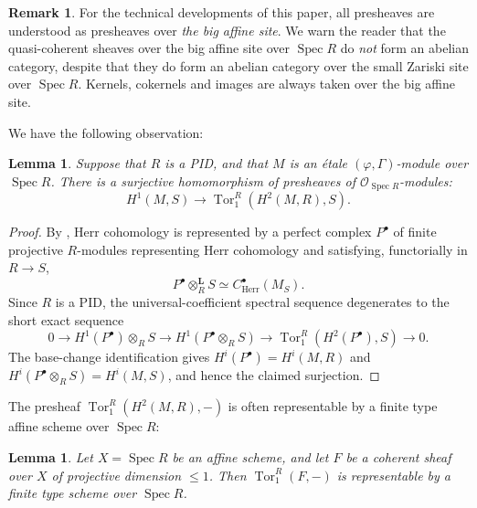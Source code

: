 \documentclass[11pt]{amsart}
\newcommand{\MAJOREDIT}[1]{{\color{revisiongreen}#1}}
\newtheorem{lem}[thm]{Lemma}
\theoremstyle{definition}
\newtheorem{remark}[thm]{Remark}
\newcommand{\cO}{\mathcal{O}}
\DeclareMathOperator{\Spec}{Spec}
\DeclareMathOperator{\Tor}{Tor}
\newcommand{\Herr}{\mathrm{Herr}}
\begin{document}
\begin{remark}
For the technical developments of this paper,
all presheaves are understood as presheaves
over {\it the big affine site}.
We warn the reader that the quasi-coherent sheaves
over the big affine site
over $\Spec R$ do {\it not} form an abelian category,
despite that they do form an abelian category over
the small Zariski site over $\Spec R$.
Kernels, cokernels and images are always
taken over the big affine site.
\end{remark}

We have the following observation:

\begin{lem}
\rm
Suppose that $R$ is a PID,
and that $M$ is an \'etale $(\varphi, \Gamma)$-module
over $\Spec R$.
There is a {\it surjective} homomorphism
of presheaves of $\cO_{\Spec R}$-modules:
\[
H^1(M,S)\to \Tor_1^R(H^2(M,R), S).
\]
\label{lem:PID-Tor}
\end{lem}

\begin{proof}
\MAJOREDIT{By \cite[Theorem 5.1.22]{EG23}, Herr cohomology is represented by a
perfect complex $P^\bullet$ of finite projective
$R$-modules representing Herr cohomology and satisfying, functorially in
$R\to S$,
\[
P^\bullet\otimes_R^{\mathbf L}S\simeq C^\bullet_{\Herr}(M_S).
\]
Since $R$ is a PID, the universal-coefficient spectral sequence degenerates
to the short exact sequence
\[
0\to H^1(P^\bullet)\otimes_R S\to H^1(P^\bullet\otimes_R S)
\to \Tor_1^R(H^2(P^\bullet),S)\to 0.
\]
The base-change identification gives
$H^i(P^\bullet)=H^i(M,R)$ and
$H^i(P^\bullet\otimes_R S)=H^i(M,S)$, and hence the claimed surjection.}
\end{proof}

The presheaf $\Tor^R_1(H^2(M,R),-)$
is often representable by a finite type
affine scheme over $\Spec R$:

\begin{lem}
\rm
Let $X=\Spec R$ be an affine scheme,
and 
let $F$ be a coherent sheaf over $X$
of projective dimension $\le 1$.
Then $\Tor^R_1(F,-)$
is representable by a finite type scheme
over $\Spec R$.
\label{lem:pd-1-representable}
\end{lem}
\end{document}
